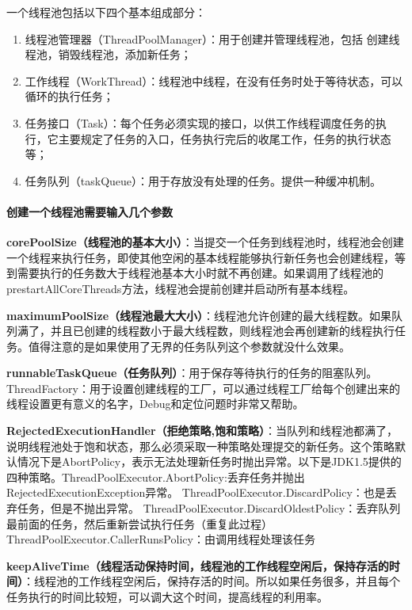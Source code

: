 \documentclass[../../../interview-questions.tex]{subfiles}
\begin{document}
一个线程池包括以下四个基本组成部分：

\begin{enumerate}
    \item {线程池管理器（ThreadPoolManager）：用于创建并管理线程池，包括 创建线程池，销毁线程池，添加新任务；}
    \item {工作线程（WorkThread）：线程池中线程，在没有任务时处于等待状态，可以循环的执行任务；}
    \item {任务接口（Task）：每个任务必须实现的接口，以供工作线程调度任务的执行，它主要规定了任务的入口，任务执行完后的收尾工作，任务的执行状态等；}
    \item {任务队列（taskQueue）：用于存放没有处理的任务。提供一种缓冲机制。}
\end{enumerate}


\paragraph{创建一个线程池需要输入几个参数}

\textbf{corePoolSize（线程池的基本大小）}：当提交一个任务到线程池时，线程池会创建一个线程来执行任务，即使其他空闲的基本线程能够执行新任务也会创建线程，等到需要执行的任务数大于线程池基本大小时就不再创建。如果调用了线程池的prestartAllCoreThreads方法，线程池会提前创建并启动所有基本线程。

\textbf{maximumPoolSize（线程池最大大小）}：线程池允许创建的最大线程数。如果队列满了，并且已创建的线程数小于最大线程数，则线程池会再创建新的线程执行任务。值得注意的是如果使用了无界的任务队列这个参数就没什么效果。

\textbf{runnableTaskQueue（任务队列）}：用于保存等待执行的任务的阻塞队列。
ThreadFactory：用于设置创建线程的工厂，可以通过线程工厂给每个创建出来的线程设置更有意义的名字，Debug和定位问题时非常又帮助。

\textbf{RejectedExecutionHandler（拒绝策略,饱和策略）}：当队列和线程池都满了，说明线程池处于饱和状态，那么必须采取一种策略处理提交的新任务。这个策略默认情况下是AbortPolicy，表示无法处理新任务时抛出异常。以下是JDK1.5提供的四种策略。ThreadPoolExecutor.AbortPolicy:丢弃任务并抛出RejectedExecutionException异常。
ThreadPoolExecutor.DiscardPolicy：也是丢弃任务，但是不抛出异常。
ThreadPoolExecutor.DiscardOldestPolicy：丢弃队列最前面的任务，然后重新尝试执行任务（重复此过程）
ThreadPoolExecutor.CallerRunsPolicy：由调用线程处理该任务

\textbf{keepAliveTime（线程活动保持时间，线程池的​​工作线程空闲后​​​，​​保持存活的时间​​​）}：线程池的工作线程空闲后，保持存活的时间。所以如果任务很多，并且每个任务执行的时间比较短，可以调大这个时间，提高线程的利用率。
\end{document}
